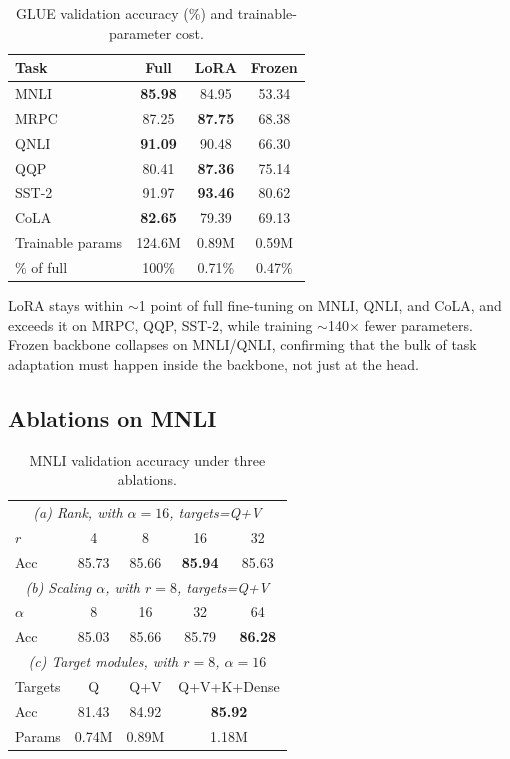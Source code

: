 \documentclass[11pt]{article}
\begin{document}
\begin{table}[h]
\centering\small
\setlength{\tabcolsep}{6pt}
\begin{tabular}{lccc}
\toprule
Task & Full & LoRA & Frozen \\
\midrule
MNLI  & \textbf{85.98} & 84.95 & 53.34 \\
MRPC  & 87.25 & \textbf{87.75} & 68.38 \\
QNLI  & \textbf{91.09} & 90.48 & 66.30 \\
QQP   & 80.41 & \textbf{87.36} & 75.14 \\
SST-2 & 91.97 & \textbf{93.46} & 80.62 \\
CoLA  & \textbf{82.65} & 79.39 & 69.13 \\
\midrule
Trainable params & 124.6M & 0.89M & 0.59M \\
\% of full        & 100\%  & 0.71\% & 0.47\% \\
\bottomrule
\end{tabular}
\caption{GLUE validation accuracy (\%) and trainable-parameter cost.}
\label{tab:main}
\end{table}

LoRA stays within $\sim$1 point of full fine-tuning on MNLI, QNLI, and CoLA, and exceeds it on MRPC, QQP, SST-2, while training $\sim$140$\times$ fewer parameters. Frozen backbone collapses on MNLI/QNLI, confirming that the bulk of task adaptation must happen inside the backbone, not just at the head.

\subsection{Ablations on MNLI}

\begin{table}[h]
\centering\small
\setlength{\tabcolsep}{5pt}
\begin{tabular}{lcccc}
\toprule
\multicolumn{5}{c}{\textit{(a) Rank, with $\alpha{=}16$, targets={\rm Q+V}}}\\
$r$ & 4 & 8 & 16 & 32 \\
Acc & 85.73 & 85.66 & \textbf{85.94} & 85.63 \\
\midrule
\multicolumn{5}{c}{\textit{(b) Scaling $\alpha$, with $r{=}8$, targets={\rm Q+V}}}\\
$\alpha$ & 8 & 16 & 32 & 64 \\
Acc & 85.03 & 85.66 & 85.79 & \textbf{86.28} \\
\midrule
\multicolumn{5}{c}{\textit{(c) Target modules, with $r{=}8$, $\alpha{=}16$}}\\
Targets & Q & Q+V & \multicolumn{2}{c}{Q+V+K+Dense} \\
Acc     & 81.43 & 84.92 & \multicolumn{2}{c}{\textbf{85.92}} \\
Params  & 0.74M & 0.89M & \multicolumn{2}{c}{1.18M} \\
\bottomrule
\end{tabular}
\caption{MNLI validation accuracy under three ablations.}
\label{tab:abl}
\end{table}
\end{document}
